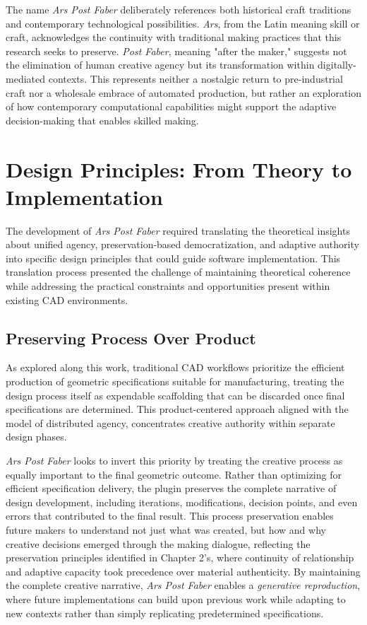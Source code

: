 \vspace{0.5cm}

The name \textit{Ars Post Faber} deliberately references both historical craft traditions and contemporary technological possibilities. \textit{Ars}, from the Latin meaning skill or craft, acknowledges the continuity with traditional making practices that this research seeks to preserve. \textit{Post Faber}, meaning "after the maker," suggests not the elimination of human creative agency but its transformation within digitally-mediated contexts. This represents neither a nostalgic return to pre-industrial craft nor a wholesale embrace of automated production, but rather an exploration of how contemporary computational capabilities might support the adaptive decision-making that enables skilled making.

\section{Design Principles: From Theory to Implementation}

The development of \textit{Ars Post Faber} required translating the theoretical insights about unified agency, preservation-based democratization, and adaptive authority into specific design principles that could guide software implementation. This translation process presented the challenge of maintaining theoretical coherence while addressing the practical constraints and opportunities present within existing CAD environments.

\subsection{Preserving Process Over Product}

As explored along this work, traditional CAD workflows prioritize the efficient production of geometric specifications suitable for manufacturing, treating the design process itself as expendable scaffolding that can be discarded once final specifications are determined. This product-centered approach aligned with the model of distributed agency, concentrates creative authority within separate design phases.

\vspace{0.5cm}

\textit{Ars Post Faber} looks to invert this priority by treating the creative process as equally important to the final geometric outcome. Rather than optimizing for efficient specification delivery, the plugin preserves the complete narrative of design development, including iterations, modifications, decision points, and even errors that contributed to the final result. This process preservation enables future makers to understand not just what was created, but how and why creative decisions emerged through the making dialogue, reflecting the preservation principles identified in Chapter 2's, where continuity of relationship and adaptive capacity took precedence over material authenticity. By maintaining the complete creative narrative, \textit{Ars Post Faber} enables a \textit{generative reproduction}, where future implementations can build upon previous work while adapting to new contexts rather than simply replicating predetermined specifications.

